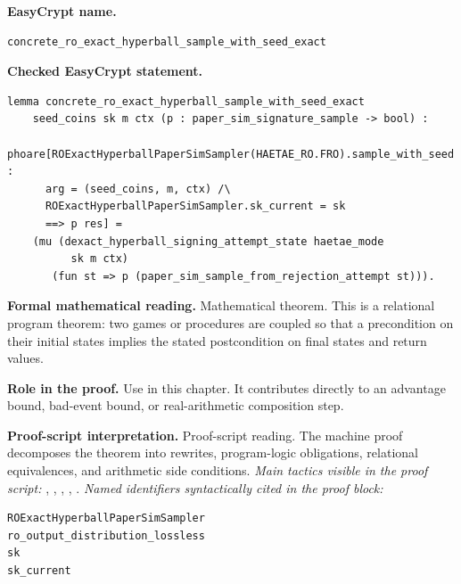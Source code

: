 \begin{formaltheorem}
\noindent\textbf{EasyCrypt name.}
\begin{lstlisting}[language=EasyCrypt,basicstyle=\ttfamily\scriptsize]
concrete_ro_exact_hyperball_sample_with_seed_exact
\end{lstlisting}
\noindent\textbf{Checked EasyCrypt statement.}
\begin{lstlisting}[language=EasyCrypt,basicstyle=\ttfamily\scriptsize]
lemma concrete_ro_exact_hyperball_sample_with_seed_exact
    seed_coins sk m ctx (p : paper_sim_signature_sample -> bool) :
  phoare[ROExactHyperballPaperSimSampler(HAETAE_RO.FRO).sample_with_seed :
      arg = (seed_coins, m, ctx) /\
      ROExactHyperballPaperSimSampler.sk_current = sk
      ==> p res] =
    (mu (dexact_hyperball_signing_attempt_state haetae_mode
          sk m ctx)
       (fun st => p (paper_sim_sample_from_rejection_attempt st))).
\end{lstlisting}
\noindent\textbf{Formal mathematical reading.}
Mathematical theorem. This is a relational program theorem: two games or procedures are coupled so that a precondition on their initial states implies the stated postcondition on final states and return values.

\noindent\textbf{Role in the proof.}
Use in this chapter. It contributes directly to an advantage bound, bad-event bound, or real-arithmetic composition step.

\noindent\textbf{Proof-script interpretation.}
Proof-script reading. The machine proof decomposes the theorem into rewrites, program-logic obligations, relational equivalences, and arithmetic side conditions.
\emph{Main tactics visible in the proof script:} \ec{proc}, \ec{wp}, \ec{rnd}, \ec{call}, \ec{smt}.
\emph{Named identifiers syntactically cited in the proof block:}
\begin{lstlisting}[language=EasyCrypt,basicstyle=\ttfamily\scriptsize]
ROExactHyperballPaperSimSampler
ro_output_distribution_lossless
sk
sk_current
\end{lstlisting}

\end{formaltheorem}

